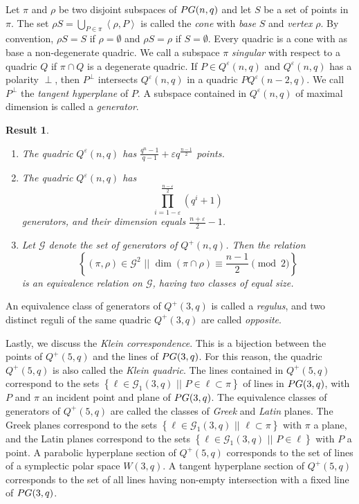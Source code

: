 \documentclass[a4paper]{article}
\newtheorem{res}[thm]{Result}
\theoremstyle{definition}
\newcommand{\eps}{\varepsilon}
\newcommand{\vspan}[1]{\left \langle #1 \right \rangle}
\newcommand{\sett}[2]{ \left\{ #1 \, \, || \, \, #2 \right \} }
\newcommand{\pg}{\textnormal{PG}}
\newcommand{\mg}{\mathcal G}
\begin{document}
Let $\pi$ and $\rho$ be two disjoint subspaces of $\pg(n,q)$ and let $S$ be a set of points in $\pi$.
The set $\rho S = \bigcup_{P \in \pi} \vspan{\rho,P}$ is called the \emph{cone} with \emph{base} $S$ and \emph{vertex} $\rho$.
By convention, $\rho S = S$ if $\rho = \emptyset$ and $\rho S = \rho$ if $S = \emptyset$.
Every quadric is a cone with as base a non-degenerate quadric.
We call a subspace $\pi$ \emph{singular} with respect to a quadric $Q$ if $\pi \cap Q$ is a degenerate quadric.
If $P \in Q^\eps(n,q)$ and $Q^\eps(n,q)$ has a polarity $\perp$, then $P^\perp$ intersects $Q^\eps(n,q)$ in a quadric $P Q^\eps(n-2,q)$.
We call $P^\perp$ the \emph{tangent hyperplane} of $P$.
A subspace contained in $Q^\eps(n,q)$ of maximal dimension is called a \emph{generator}.
\begin{res}
 \label{Res:Quadrics}
 \begin{enumerate}
  \item The quadric $Q^\eps(n,q)$ has $\frac{q^n-1}{q-1} + \eps q^\frac{n-1}2$ points.
  \item \label{Res:Quadrics:Generators} The quadric $Q^\eps(n,q)$ has
  \[
   \prod_{i=1-\eps}^\frac{n-\eps}2 (q^i+1)
  \]
  generators, and their dimension equals $\frac{n+\eps}2-1$.
  \item \label{Res:Quadrics:Equivalence} Let $\mg$ denote the set of generators of $Q^+(n,q)$.
  Then the relation
  \[
   \sett{ (\pi, \rho) \in \mg^2 }{ \dim (\pi \cap \rho) \equiv \frac{n-1}2 \pmod 2 }
  \]
  is an equivalence relation on $\mg$, having two classes of equal size.
 \end{enumerate}
\end{res}

An equivalence class of generators of $Q^+(3,q)$ is called a \emph{regulus}, and two distinct reguli of the same quadric $Q^+(3,q)$ are called \emph{opposite}.

Lastly, we discuss the \emph{Klein correspondence}.
This is a bijection between the points of $Q^+(5,q)$ and the lines of $\pg(3,q)$.
For this reason, the quadric $Q^+(5,q)$ is also called the \emph{Klein quadric}.
The lines contained in $Q^+(5,q)$ correspond to the sets $\sett{\ell \in \mg_1(3,q)}{P \in \ell \subset \pi}$ of lines in $\pg(3,q)$, with $P$ and $\pi$ an incident point and plane of $\pg(3,q)$.
The equivalence classes of generators of $Q^+(5,q)$ are called the classes of \emph{Greek} and \emph{Latin} planes.
The Greek planes correspond to the sets $\sett{\ell \in \mg_1(3,q)}{\ell \subset \pi}$ with $\pi$ a plane, and the Latin planes correspond to the sets $\sett{\ell \in \mg_1(3,q)}{P \in \ell}$ with $P$ a point.
A parabolic hyperplane section of $Q^+(5,q)$ corresponds to the set of lines of a symplectic polar space $W(3,q)$.
A tangent hyperplane section of $Q^+(5,q)$ corresponds to the set of all lines having non-empty intersection with a fixed line of $\pg(3,q)$.
\end{document}
